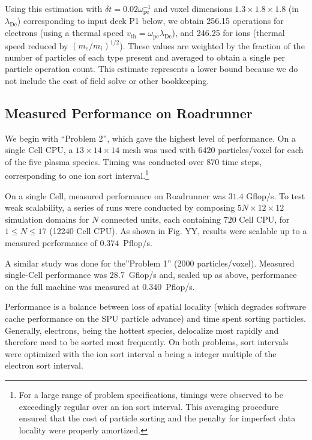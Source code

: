 \documentclass[journal,twoside]{IEEEtran}
\newcommand{\lde}      {\lambda_{\mathrm{De}}}
\newcommand{\wpe}      {\omega_{\mathrm{pe}}}
\begin{document}
Using this estimation with $\delta t = 0.02 \wpe^{-1}$ and voxel
dimensions $1.3 \times 1.8 \times 1.8$ (in $\lde$) corresponding to
input deck P1 below, we obtain 256.15 operations for electrons (using
a thermal speed $v_{\mathrm{th}} = \wpe \lde$), and 246.25 for ions
(thermal speed reduced by $(m_e/m_i)^{1/2}$).  These values are
weighted by the fraction of the number of particles of each type
present and averaged to obtain a single per particle operation count.
This estimate represents a lower bound because we do not include the
cost of field solve or other bookkeeping.

\subsection{Measured Performance on Roadrunner}

We begin with ``Problem 2'', which gave the highest level of
performance.  On a single Cell CPU, a $13 \times 14 \times 14$ mesh
was used with $6420$ particles/voxel for each of the five plasma
species.  Timing was conducted over $870$ time steps, corresponding to
one ion sort interval.\footnote{For a large range of problem
specifications, timings were observed to be exceedingly regular over
an ion sort interval.  This averaging procedure ensured that the cost
of particle sorting and the penalty for imperfect data locality were
properly amortized.}

On a single Cell, measured performance on Roadrunner was $31.4$
Gflop/s.  To test weak scalability, a series of runs were conducted by
composing $5N \times 12 \times 12$ simulation domains for $N$
connected units, each containing $720$ Cell CPU, for $1 \le N \le 17$
(12240 Cell CPU).  As shown in Fig. YY, results were scalable up to a
measured performance of $0.374$~Pflop/s.

A similar study was done for the''Problem 1'' (2000 particles/voxel).
Measured single-Cell performance was $28.7$~Gflop/s and, scaled up as
above, performance on the full machine was measured at
$0.340$~Pflop/s.

Performance is a balance between loss of spatial locality (which
degrades software cache performance on the SPU particle advance) and
time spent sorting particles.  Generally, electrons, being the hottest
species, delocalize most rapidly and therefore need to be sorted most
frequently.  On both problems, sort intervals were optimized with the
ion sort interval a being a integer multiple of the electron sort
interval.
\end{document}

